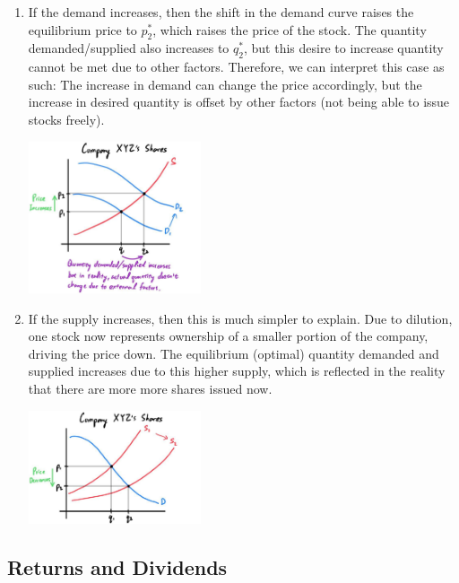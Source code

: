 \documentclass{article}
\begin{document}
    \begin{enumerate}
      \item If the demand increases, then the shift in the demand curve raises the equilibrium price to $p_2^*$, which raises the price of the stock. The quantity demanded/supplied also increases to $q_2^*$, but this desire to increase quantity cannot be met due to other factors. Therefore, we can interpret this case as such: The increase in demand can change the price accordingly, but the increase in desired quantity is offset by other factors (not being able to issue stocks freely). 
      \begin{center}
        \includegraphics[width=0.4\textwidth]{img/Stock_Demand_Increase.jpg}
      \end{center}

      \item If the supply increases, then this is much simpler to explain. Due to dilution, one stock now represents ownership of a smaller portion of the company, driving the price down. The equilibrium (optimal) quantity demanded and supplied increases due to this higher supply, which is reflected in the reality that there are more more shares issued now. 
      \begin{center}
        \includegraphics[width=0.4\textwidth]{img/Stock_Supply_Increase.jpg}
      \end{center}
    \end{enumerate}

  \subsection{Returns and Dividends}
\end{document}
